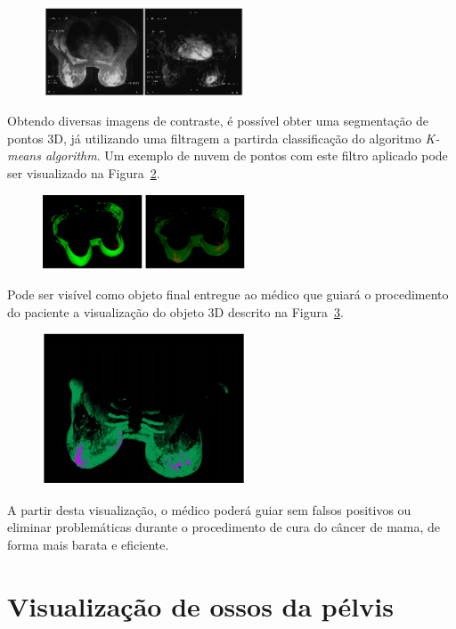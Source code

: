 \documentclass[letterpaper, 10 pt, conference]{ieeeconf}
\begin{document}
\begin{figure}[htb]
\label{fig:contraste}
\includegraphics[width=6cm]{./img/contraste.png}
\centering
\end{figure}

Obtendo diversas imagens de contraste, é possível obter uma segmentação de pontos 3D, já utilizando uma filtragem a partirda classificação do algoritmo \textit{K-means algorithm}.
%
Um exemplo de nuvem de pontos com este filtro aplicado pode ser visualizado na Figura~\ref{fig:reconstrucao}.

\begin{figure}[htb]
\label{fig:reconstrucao}
\includegraphics[width=6cm]{./img/reconstrucao.png}
\centering
\end{figure}

Pode ser visível como objeto final entregue ao médico que guiará o procedimento do paciente a visualização do objeto 3D descrito na Figura~\ref{fig:final}.

\begin{figure}[htb]
\label{fig:final}
\includegraphics[width=6cm]{./img/final.png}
\centering
\end{figure}

A partir desta visualização, o médico poderá guiar sem falsos positivos ou eliminar problemáticas durante o procedimento de cura do câncer de mama, de forma mais barata e eficiente.

\section{Visualização de ossos da pélvis}
\end{document}
